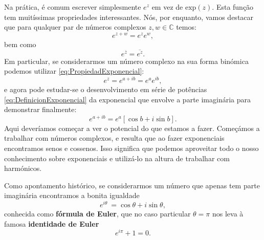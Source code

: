 Na prática, é comum escrever simplesmente $e^z$ em vez de $\text{exp}(z)$. Esta função tem muitíssimas propriedades interessantes. Nós, por enquanto, vamos destacar que para qualquer par de números complexos $z,w\in\mathbb{C}$ temos:
\begin{equation}
  \label{eq:PropiedadExponencial}
  e^{z+w} = e^z e^w,
\end{equation}
bem como
\begin{equation}
  \label{eq:ConjugadoExponencial}
  e^{\overline{z}} = \overline{e^z}.
\end{equation}
Em particular, se considerarmos um número complexo na sua forma binómica podemos utilizar \eqref{eq:PropiedadExponencial}:
\[
e^z = e^{a+ib} = e^a e^{ib},
\]
e agora pode estudar-se o desenvolvimento em série de potências \eqref{eq:DefinicionExponencial} da exponencial que envolve a parte imaginária para demonstrar finalmente:
\[
e^{a+ib} = e^a \left[\cos b + i\sin b\right].
\]
Aqui deveríamos começar a ver o potencial do que estamos a fazer. Começámos a trabalhar com números complexos, e resulta que ao fazer exponenciais encontramos senos e cossenos. Isso significa que podemos aproveitar todo o nosso conhecimento sobre exponenciais e utilizá-lo na altura de trabalhar com harmónicos.

\begin{mybox}
Como apontamento histórico, se considerarmos um número que apenas tem parte imaginária encontramos a bonita igualdade
\begin{equation}
  \label{eq:EulerFormula}
  e^{i\theta}\ = \cos\theta + i\sin\theta,
\end{equation}
conhecida como \textbf{fórmula de Euler}, que no caso particular $\theta = \pi $  nos leva à famosa \textbf{identidade de Euler}
\[e^{i\pi} + 1 = 0.\]
\end{mybox}


